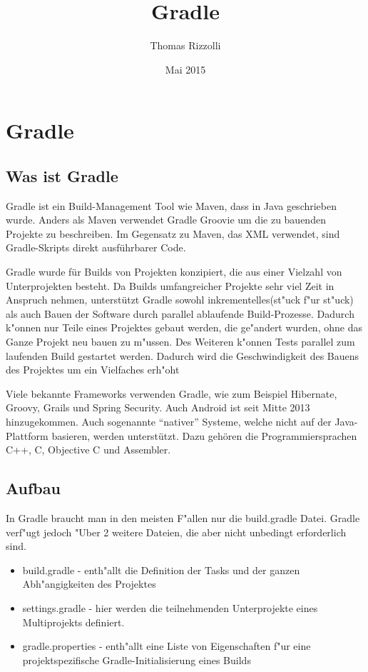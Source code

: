\title{Gradle}
\author{Thomas Rizzolli}
\date{Mai 2015}
\section{Gradle}
\maketitle

\subsection{Was ist Gradle}
Gradle ist ein Build-Management Tool wie Maven, dass in Java geschrieben wurde. Anders als Maven verwendet Gradle Groovie um die zu bauenden Projekte zu beschreiben. Im Gegensatz zu Maven, das XML verwendet, sind Gradle-Skripts direkt ausführbarer Code.

Gradle wurde für Builds von Projekten konzipiert, die aus einer Vielzahl von Unterprojekten besteht.
Da Builds umfangreicher Projekte sehr viel Zeit in Anspruch nehmen, unterstützt Gradle sowohl inkrementelles(st"uck f"ur st"uck) als auch Bauen der Software durch parallel ablaufende Build-Prozesse. Dadurch k"onnen nur Teile eines Projektes gebaut werden, die ge"andert wurden, ohne das Ganze Projekt neu bauen zu m"ussen. Des Weiteren k"onnen Tests parallel zum laufenden Build gestartet werden. Dadurch wird die Geschwindigkeit des Bauens des Projektes um ein Vielfaches erh"oht

Viele bekannte Frameworks verwenden Gradle, wie zum Beispiel Hibernate, Groovy, Grails und Spring Security. Auch Android ist seit Mitte 2013 hinzugekommen. Auch sogenannte ``nativer'' Systeme, welche nicht auf der Java-Plattform basieren, werden unterstützt. Dazu gehören die Programmiersprachen C++, C, Objective C und Assembler.

\subsection{Aufbau}
In Gradle braucht man in den meisten F"allen nur die build.gradle Datei. Gradle verf"ugt jedoch "Uber 2 weitere Dateien, die aber nicht unbedingt erforderlich sind.
\begin{itemize}
\item build.gradle - enth"allt die Definition der Tasks und der ganzen Abh"angigkeiten des Projektes
\item settings.gradle - hier werden die teilnehmenden Unterprojekte eines Multiprojekts definiert.
\item gradle.properties - enth"allt eine Liste von Eigenschaften f"ur eine projektspezifische Gradle-Initialisierung eines Builds
\end{itemize}

